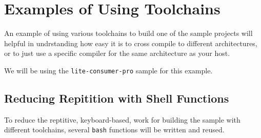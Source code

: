 \section{Examples of Using Toolchains}

An example of using various toolchains to build one of the sample
projects will helpful in undrstanding how easy it is to cross compile
to different architectures, or to just use a specific compiler for the
same architecture as your host.

We will be using the \texttt{lite-consumer-pro} sample for this
example.

\subsection{Reducing Repitition with Shell Functions}

To reduce the reptitive, keyboard-based, work for building the sample
with different toolchains, several \texttt{bash} functions will be
written and reused.

